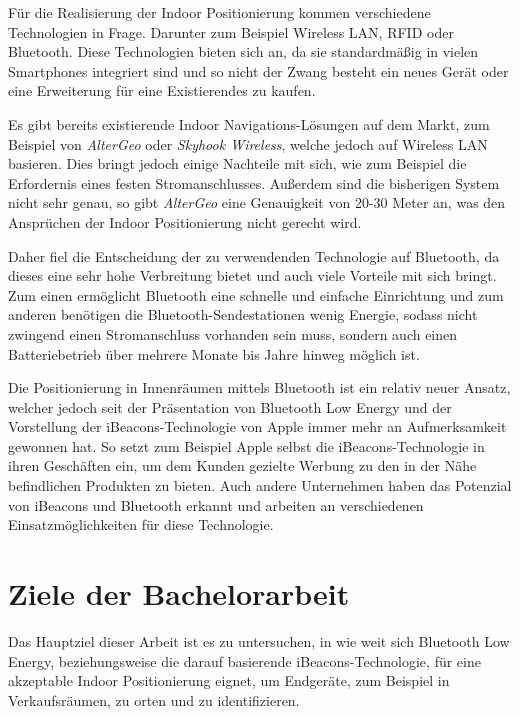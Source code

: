 Für die Realisierung der Indoor Positionierung kommen verschiedene Technologien in Frage. Darunter zum Beispiel Wireless LAN, RFID oder Bluetooth.
Diese Technologien bieten sich an, da sie standardmäßig in vielen Smartphones integriert sind und so nicht der Zwang besteht ein neues Gerät oder eine Erweiterung für eine Existierendes zu kaufen.

Es gibt bereits existierende Indoor Navigations-Lösungen auf dem Markt, zum Beispiel von \emph{AlterGeo} oder \emph{Skyhook Wireless}, welche jedoch auf Wireless LAN basieren. Dies bringt jedoch einige Nachteile mit sich, wie zum Beispiel die Erfordernis eines festen Stromanschlusses. Außerdem sind die bisherigen System nicht sehr genau, so gibt \emph{AlterGeo} eine Genauigkeit von 20-30 Meter an, was den Ansprüchen der Indoor Positionierung nicht gerecht wird.

Daher fiel die Entscheidung der zu verwendenden Technologie auf Bluetooth, da dieses eine sehr hohe Verbreitung bietet und auch viele Vorteile mit sich bringt. Zum einen ermöglicht Bluetooth eine schnelle und einfache Einrichtung und zum anderen benötigen die Bluetooth-Sendestationen wenig Energie, sodass nicht zwingend einen Stromanschluss vorhanden sein muss, sondern auch einen Batteriebetrieb über mehrere Monate bis Jahre hinweg möglich ist.

Die Positionierung in Innenräumen mittels Bluetooth ist ein relativ neuer Ansatz, welcher jedoch seit der Präsentation von Bluetooth Low Energy und der Vorstellung der iBeacons-Technologie von Apple immer mehr an Aufmerksamkeit gewonnen hat. So setzt zum Beispiel Apple selbst die iBeacons-Technologie in ihren Geschäften ein, um dem Kunden gezielte Werbung zu den in der Nähe befindlichen Produkten zu bieten. Auch andere Unternehmen haben das Potenzial von iBeacons und Bluetooth erkannt und arbeiten an verschiedenen Einsatzmöglichkeiten für diese Technologie.

\section{Ziele der Bachelorarbeit}
\label{sec:introduction:goal}

Das Hauptziel dieser Arbeit ist es zu untersuchen, in wie weit sich Bluetooth Low Energy, beziehungsweise die darauf basierende iBeacons-Technologie, für eine akzeptable Indoor Positionierung eignet, um Endgeräte, zum Beispiel in Verkaufsräumen, zu orten und zu identifizieren.

